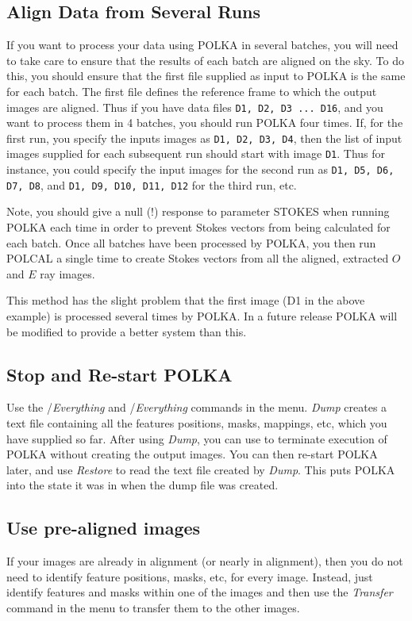 \subsection {Align Data from Several Runs}
If you want to process your data using POLKA in several batches, you will
need to take care to ensure that the results of each batch are aligned on
the sky. To do this, you should ensure that the first file supplied as
input to POLKA is the same for each batch. The first file defines the
reference frame to which the output images are aligned. Thus if you have
data files \texttt{D1, D2, D3 ... D16}, and you want to process them in 4
batches, you should run POLKA four times. If, for the first run, you
specify the inputs images as \texttt{D1, D2, D3, D4}, then the list of
input images supplied for each subsequent run should start with image
\texttt{D1}. Thus for instance, you could specify the input images for
the second run as \texttt{D1, D5, D6, D7, D8}, and \texttt{D1, D9, D10, 
D11, D12} for the third run, etc.

Note, you should give a null (!) response to parameter STOKES when
running POLKA each time in order to prevent Stokes vectors from being 
calculated for each batch. Once all batches have been processed by POLKA, 
you then run POLCAL a single time to create Stokes vectors from all the 
aligned, extracted $O$ and $E$ ray images.

This method has the slight problem that the first image (D1 in the above
example) is processed several times by POLKA. In a future release POLKA will 
be modified to provide a better system than this.

\subsection {Stop and Re-start POLKA}
Use the /{\em Everything} and 
/{\em Everything} commands in the 
 menu. {\em Dump} creates a text file
containing all the features positions, masks, mappings, etc, which you
have supplied so far. After using {\em Dump}, you can use  to terminate execution of POLKA without creating the
output images. You can then re-start POLKA later, and use {\em Restore}
to read the text file created by {\em Dump}. This puts POLKA into the
state it was in when the dump file was created.

\subsection {Use pre-aligned images}
If your images are already in alignment (or nearly in alignment), then
you do not need to identify feature positions, masks, etc, for every image.
Instead, just identify features and masks within one of the images and then 
use the {\em Transfer} command in the 
menu to transfer them to the other images.

